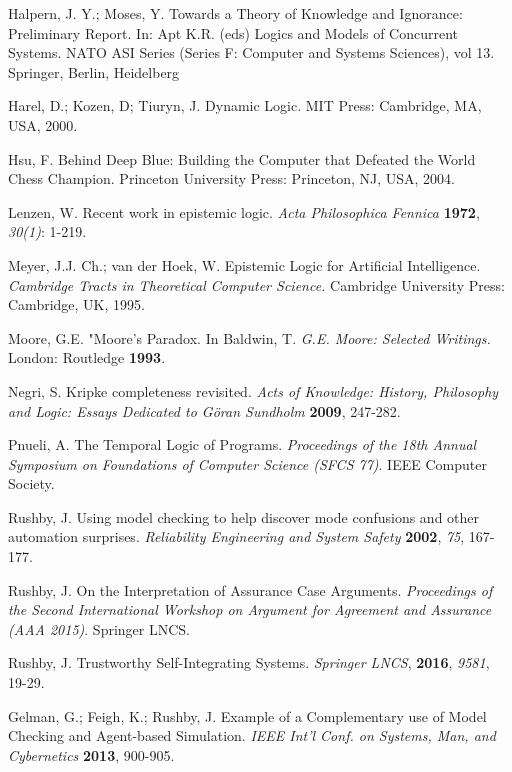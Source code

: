 \begin{thebibliography}{9}
	 	Halpern, J. Y.; Moses, Y.  Towards a Theory of Knowledge and Ignorance: Preliminary Report. In: Apt K.R. (eds) Logics and Models of Concurrent Systems. NATO ASI Series (Series F: Computer and Systems Sciences), vol 13. Springer, Berlin, Heidelberg
	 	
	 	Harel, D.; Kozen, D; Tiuryn, J. Dynamic Logic. MIT Press: Cambridge, MA, USA, 2000.
	 	
	 	Hsu, F. Behind Deep Blue: Building the Computer that Defeated the World Chess Champion. Princeton University Press: Princeton, NJ, USA, 2004.
	 	
	 	Lenzen, W. Recent work in epistemic logic. {\em Acta Philosophica Fennica} {\bf 1972}, {\em 30(1)}: 1-219.
	 	
	 	Meyer, J.J. Ch.; van der Hoek, W. Epistemic Logic for Artificial Intelligence. {\em Cambridge Tracts in Theoretical Computer Science.} Cambridge University Press: Cambridge, UK, 1995.
	 	
	 	Moore, G.E. "Moore's Paradox. In Baldwin, T. {\em G.E. Moore: Selected Writings.} London: Routledge {\bf 1993}.
	 	
	 	Negri, S. Kripke completeness revisited. {\em Acts of Knowledge: History, Philosophy and Logic: Essays Dedicated to G{\"o}ran Sundholm} {\bf 2009}, 247-282.
	 	
	 	Pnueli, A.  The Temporal Logic of Programs. {\em Proceedings of the 18th Annual Symposium on Foundations of Computer Science (SFCS 77)}. IEEE Computer Society.
	 	
	 	Rushby, J. Using model checking to help discover mode confusions and other automation surprises. {\em Reliability Engineering and System Safety} {\bf 2002}, {\em 75}, 167-177.
	 	
	 	Rushby, J. On the Interpretation of Assurance Case Arguments. {\em Proceedings of the Second International Workshop on Argument for Agreement and Assurance (AAA 2015)}. Springer LNCS.
	 	
	 	Rushby, J. Trustworthy Self-Integrating Systems. {\em Springer LNCS}, {\bf 2016}, {\em 9581}, 19-29.
	 	
	 	Gelman, G.; Feigh, K.; Rushby, J. Example of a Complementary use of Model Checking and Agent-based Simulation. {\em IEEE Int'l Conf. on Systems, Man, and Cybernetics} {\bf 2013}, 900-905.
	 	

\end{thebibliography}
